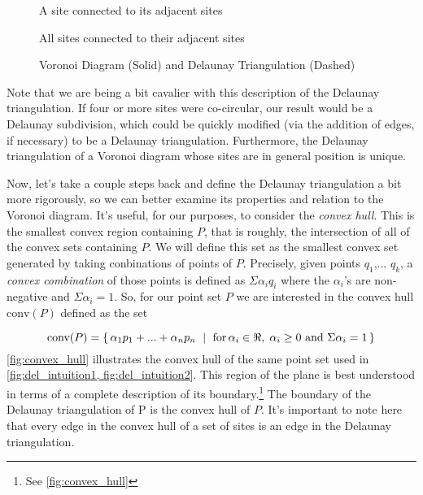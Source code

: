 \documentclass[12pt,twoside]{reedthesis}
\begin{document}
    \begin{figure}[!htb]
      \centering
      \begin{subtable}{.475\textwidth}
        
        \caption{A site connected to its adjacent sites}
        \label{fig:del_intuition1}
      \end{subtable}%
      \begin{subtable}{.475\textwidth}
        
        \caption{All sites connected to their adjacent sites}
        \label{fig:del_intuition2}
      \end{subtable}
      \caption{Voronoi Diagram (Solid) and Delaunay Triangulation (Dashed)}
      \label{fig:del_intuition}
    \end{figure}

    Note that we are being a bit cavalier with this description of the Delaunay triangulation. If four or more sites were co-circular, our result would be a Delaunay subdivision, which could be quickly modified (via the addition of edges, if necessary) to be a Delaunay triangulation. Furthermore, the Delaunay triangulation of a  Voronoi diagram whose sites are in general position is unique.\par

    Now, let's take a couple steps back and define the Delaunay triangulation a bit more rigorously, so we can better examine its properties and relation to the Voronoi diagram. It's useful, for our purposes, to consider the \emph{convex hull}.  This is the smallest convex region containing $P$, that is roughly, the intersection of all of the convex sets containing $P$. We will define this set as the smallest convex set generated by taking conbinations of points of $P$. Precisely, given points $q_{1}$,... $q_{k}$, a \emph{convex combination} of those points is defined as $\Sigma\alpha_{i}q_{i}$ where the $\alpha_{i}$'s are non-negative and $\Sigma\alpha_{i}=1.$  So, for our point set $P$ we are interested in the convex hull  $\mbox{conv}(P)$ defined as the set


    \[
     \mbox{conv}(P) = \{\, \alpha_{1}p_{1} + ... + \alpha_{n}p_{n} \ \mid\ \text{for$ \,\alpha_{i} \in \Re, \; \alpha_{i} \geq 0$ and $\Sigma\alpha_{i} = 1$}\,\} 
    \]
    \cref{fig:convex_hull} illustrates the convex hull of the same point set used in \cref{fig:del_intuition1, fig:del_intuition2}. 
    This region of the plane is best understood in terms of a complete description of its boundary.\footnote{See \cref{fig:convex_hull}} 
    The boundary of the Delaunay triangulation of P is the convex hull of $P$. It's important to note here that every edge in the convex hull of a set of sites is an edge in the Delaunay triangulation.
\end{document}
